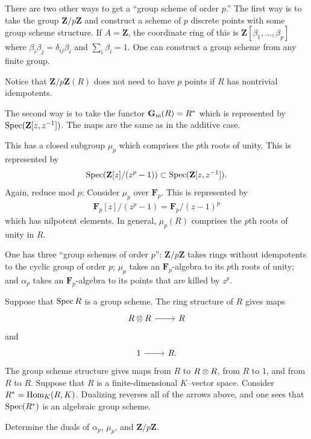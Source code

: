 \documentclass [11 pt, oneside] {article}
\begin{document}
There are two other ways to get a ``group scheme of order $p$.'' The first way is to take the group $\mathbf{Z}/p\mathbf{Z}$ and construct a scheme of $p$ discrete points with some group scheme structure. If $A=\mathbf{Z}$, the coordinate ring of this is $\mathbf{Z}[\beta_1,\hdots, \beta_p]$ where $\beta_{i}\beta_j =\delta_{ij}\beta_i $ and $\sum_{i}^{} \beta_i=1$. One can construct a group scheme from any finite group.

\begin{remark}
	Notice that $\mathbf{Z}/p\mathbf{Z}(R)$ does not need to have $p$ points if $R$ has nontrivial idempotents.
\end{remark}

The second way is to take the functor $\mathbf{G}\textsubscript{m}(R)=R^*$ which is represented by $\operatorname{Spec} (\mathbf{Z}[z,z^{-1}])$. 
The maps are the same as in the additive case.

This has a closed subgroup $\mu_p$ which comprises the $p$th roots of unity. This is represented by
\begin{align*}
	\operatorname{Spec} (\mathbf{Z}[z]/(z^p-1)) \subset \operatorname{Spec} (\mathbf{Z}[z,z^{-1}]).
\end{align*}
Again, reduce mod $p$: Consider $\mu_p$ over $\mathbf{F}_{p}$. This is represented by
\begin{align*}
	\mathbf{F}_{p}[z]/(z^p-1) =  \mathbf{F}_{p}/(z-1) ^p
\end{align*}
which has nilpotent elements. 
In general, $\mu_p(R)$ comprises the $p$th roots of unity in $R$.

One has three ``group schemes of order $p$'': $\mathbf{Z}/p\mathbf{Z}$ takes rings without idempotents to the cyclic group of order $p$; $\mu_p$ takes an $\mathbf{F}_{p}$-algebra to its $p$th roots of unity; and $\alpha_p$ takes an $\mathbf{F}_{p}$-algebra to its points that are killed by $z^p$.

\begin{exercise}\label{cduality}\text{}
Suppose that $\operatorname{Spec} R$ is a group scheme. The ring structure of $R$ gives maps 
\[
\begin{tikzcd}
R\tensor R\ar[r]& R
\end{tikzcd}
\] 
and 
 \[
\begin{tikzcd}
1\ar[r]& R.
\end{tikzcd}
\] 
The group scheme structure gives maps from $R$ to $R\otimes R$, from $R$ to $1$, and from $R$ to $R$. 
Suppose that $R$ is a finite-dimensional $K$--vector space. Consider $R^* = \operatorname{Hom}_{K}(R, K)$. Dualizing reverses all of the arrows above, and one sees that $\operatorname{Spec} (R^*)$ is an algebraic group scheme.

Determine the duals of $\alpha_p$, $\mu_p$, and $\mathbf{Z}/p\mathbf{Z}$.
\end{exercise}
\end{document}
